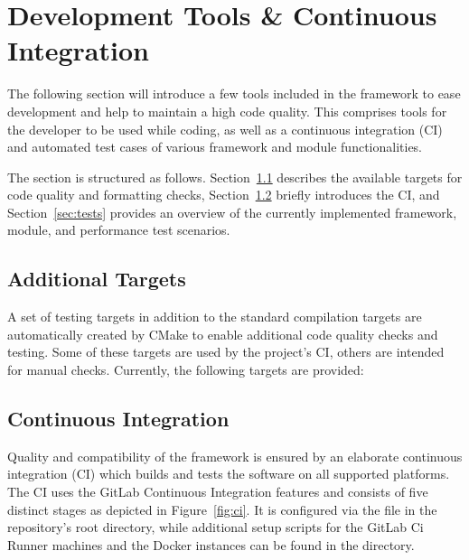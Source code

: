 \section{Development Tools \& Continuous Integration}
\label{sec:testing}

The following section will introduce a few tools included in the framework to ease development and help to maintain a high code quality. This comprises tools for the developer to be used while coding, as well as a continuous integration (CI) and automated test cases of various framework and module functionalities.

The section is structured as follows.
Section~\ref{sec:targets} describes the available  targets for code quality and formatting checks, Section~\ref{sec:ci} briefly introduces the CI, and Section~\ref{sec:tests} provides an overview of the currently implemented framework, module, and performance test scenarios.

\subsection{Additional Targets}
\label{sec:targets}

A set of testing targets in addition to the standard compilation targets are automatically created by CMake to enable additional code quality checks and testing.
Some of these targets are used by the project's CI, others are intended for manual checks.
Currently, the following targets are provided:

\begin{description}
  \item[]
  \item[]
  \item[]
  \item[]
\end{description}

\subsection{Continuous Integration}
\label{sec:ci}

Quality and compatibility of the \apsq framework is ensured by an elaborate continuous integration (CI) which builds and tests the software on all supported platforms.
The \apsq CI uses the GitLab Continuous Integration features and consists of five distinct stages as depicted in Figure~\ref{fig:ci}.
It is configured via the  file in the repository's root directory, while additional setup scripts for the GitLab Ci Runner machines and the Docker instances can be found in the  directory.


